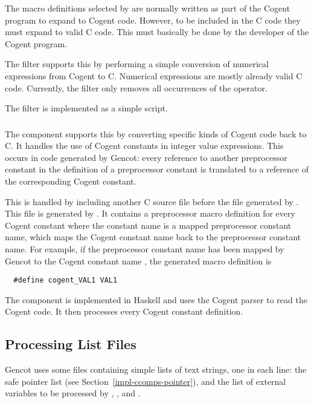 The macro definitions selected by  are normally written as part of the Cogent program to expand 
to Cogent code. However, to be included in the C code they must expand to valid C code. This must basically be done
by the developer of the Cogent program. 

The filter  supports this by performing a simple conversion of numerical expressions from Cogent
to C. Numerical expressions are mostly already valid C code. Currently, the filter only removes all occurrences
of the  operator.

The filter is implemented as a simple  script.

\subsubsection{}

The  component supports this by converting specific kinds of Cogent code back to C. It handles 
the use of Cogent constants in integer value expressions. This occurs in code generated by Gencot: every reference 
to another preprocessor constant in the definition of a preprocessor constant is translated to a reference of the 
corresponding Cogent constant.

This is handled by including another C source file before the file generated by . This
file is generated by . It contains a preprocessor macro definition for every Cogent constant
where the constant name is a mapped preprocessor constant name, which maps the Cogent constant name back to 
the preprocessor constant name. For example, if the preprocessor constant name  has been mapped by
Gencot to the Cogent constant name , the generated macro definition is
\begin{verbatim}
  #define cogent_VAL1 VAL1
\end{verbatim}

The component  is implemented in Haskell and uses the Cogent parser to read the Cogent code.
It then processes every Cogent constant definition.

\subsection{Processing List Files}
\label{impl-ocomps-prclist}

Gencot uses some files containing simple lists of text strings, one in each line: the safe pointer list (see 
Section~\ref{impl-ccomps-pointer}), and the list of external variables to be processed by , 
, and .

